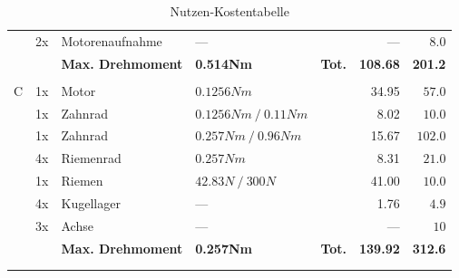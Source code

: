 \begin{longtable}{p{0.5cm}p{0.8cm}lp{3cm}p{0.5cm}rr}
      & 2x    & Motorenaufnahme & {---}                & & {---}  & $8.0$  \\
      & &\textbf{Max. Drehmoment} & \textbf{0.514Nm}   &\textbf{Tot.} & \textbf{108.68} & \textbf{201.2} \\
      &       &                 &                      & &          &  \\
    \multirow{8}[2]{*}{C} 
      & 1x    & Motor           & $0.1256 Nm$          & & 34.95  & $57.0$ \\
      & 1x    & Zahnrad         & $0.1256 Nm~/~0.11 Nm$& & 8.02   & $10.0$ \\
      & 1x    & Zahnrad         & $0.257 Nm~/~0.96 Nm$ & & 15.67  & $102.0$ \\
      & 4x    & Riemenrad       & $0.257 Nm$           & & 8.31   & $21.0$ \\
      & 1x    & Riemen          & $42.83 N~/~300 N$    & & 41.00  & $10.0$ \\
      & 4x    & Kugellager      & {---}                & & 1.76   & $4.9$ \\
      & 3x    & Achse           & {---}                & & {---}  & $10$ \\
      & & \textbf{Max. Drehmoment} & \textbf{0.257Nm} & \textbf{Tot.} & \textbf{139.92} & \textbf{312.6} \\
      &       &                 &                     &  &          &  \\
  \caption{Nutzen-Kostentabelle}       
  \label{tab:addlabel}
\end{longtable}